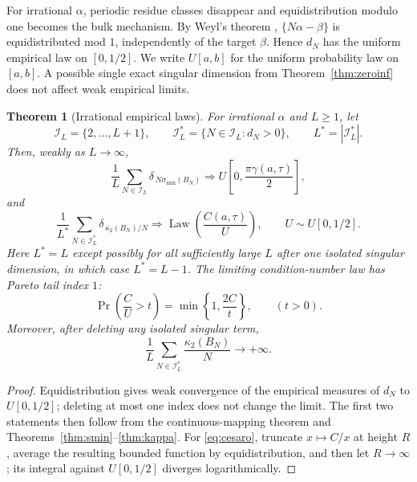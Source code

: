 \documentclass[11pt,reqno]{amsart}
\theoremstyle{plain}
\newtheorem{theorem}{Theorem}
\theoremstyle{definition}
\newcommand{\BN}{B_N}
\begin{document}
For irrational $\alpha$, periodic residue classes disappear and equidistribution
modulo one becomes the bulk mechanism.  By Weyl's theorem \cite{Weyl},
$\{N\alpha-\beta\}$ is equidistributed mod $1$, independently of the target
$\beta$.  Hence $d_N$ has the uniform empirical law on $[0,1/2]$.  We write
$U[a,b]$ for the uniform probability law on $[a,b]$.  A possible single exact
singular dimension from Theorem~\ref{thm:zeroinf} does not affect weak empirical
limits.

\begin{theorem}[Irrational empirical laws]\label{thm:irr-laws}
For irrational $\alpha$ and $L\ge1$, let
\[
\mathcal I_L=\{2,\ldots,L+1\},\qquad
\mathcal I_L^*=\{N\in\mathcal I_L:d_N>0\},
\qquad L^*=|\mathcal I_L^*|.
\]
Then, weakly as $L\to\infty$,
\begin{equation}\label{eq:uniformlaw}
\frac1L\sum_{N\in\mathcal I_L}
\delta_{\,N\sigma_{\min}(\BN)}
\Longrightarrow
U\left[0,\frac{\pi\gamma(a,\tau)}2\right],
\end{equation}
and
\begin{equation}\label{eq:paretolaw}
\frac1{L^*}\sum_{N\in\mathcal I_L^*}
\delta_{\,\kappa_2(\BN)/N}
\Longrightarrow
\operatorname{Law}\!\left(\frac{C(a,\tau)}{U}\right),
\qquad U\sim U[0,1/2].
\end{equation}
Here $L^*=L$ except possibly for all sufficiently large $L$ after one isolated
singular dimension, in which case $L^*=L-1$.  The limiting condition-number law has
Pareto tail index $1$:
\begin{equation}\label{eq:paretotail}
\Pr\left(\frac{C}{U}>t\right)
=\min\left\{1,\frac{2C}{t}\right\},\qquad (t>0).
\end{equation}
Moreover, after deleting any isolated singular term,
\begin{equation}\label{eq:cesaro}
\frac1L\sum_{N\in\mathcal I_L^*}\frac{\kappa_2(\BN)}{N}
\longrightarrow+\infty.
\end{equation}
\end{theorem}

\begin{proof}
Equidistribution gives weak convergence of the empirical measures of $d_N$ to
$U[0,1/2]$; deleting at most one index does not change the limit.  The first two
statements then follow from the continuous-mapping theorem and
Theorems~\ref{thm:smin}--\ref{thm:kappa}.  For
\eqref{eq:cesaro}, truncate $x\mapsto C/x$ at height $R$, average the resulting
bounded function by equidistribution, and then let $R\to\infty$; its integral against
$U[0,1/2]$ diverges logarithmically.
\end{proof}
\end{document}
